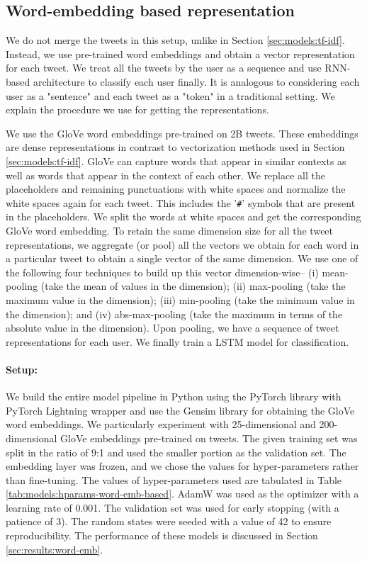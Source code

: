 \subsection{Word-embedding based representation}
\label{sec:models:word-emb-based}

We do not merge the tweets in this setup, unlike in Section \ref{sec:models:tf-idf}. Instead, we use pre-trained word embeddings and obtain a vector representation for each tweet. We treat all the tweets by the user as a sequence and use \ac{RNN}-based architecture to classify each user finally. It is analogous to considering each user as a "sentence" and each tweet as a "token" in a traditional setting. We explain the procedure we use for getting the representations.

We use the \ac{GloVe} \cite{glove} word embeddings pre-trained on 2B tweets. These embeddings are dense representations in contrast to vectorization methods used in Section \ref{sec:models:tf-idf}. \ac{GloVe} can capture words that appear in similar contexts as well as words that appear in the context of each other. We replace all the \maskEmoji placeholders and remaining punctuations with white spaces and normalize the white spaces again for each tweet. This includes the '\texttt{\#}' symbols that are present in the placeholders. We split the words at white spaces and get the corresponding \ac{GloVe} word embedding. To retain the same dimension size for all the tweet representations, we aggregate (or pool) all the vectors we obtain for each word in a particular tweet to obtain a single vector of the same dimension. We use one of the following four techniques to build up this vector dimension-wise-- (i) mean-pooling (take the mean of values in the dimension); (ii) max-pooling (take the maximum value in the dimension); (iii) min-pooling (take the minimum value in the dimension); and (iv) abs-max-pooling (take the maximum in terms of the absolute value in the dimension). Upon pooling, we have a sequence of tweet representations for each user. We finally train a \ac{LSTM} model \cite{lstm} for classification.


\paragraph{Setup:} We build the entire model pipeline in Python using the PyTorch \cite{pytorch} library with PyTorch Lightning \cite{pytorch_lightning} wrapper and use the Gensim \cite{gensim} library for obtaining the \ac{GloVe} word embeddings. We particularly experiment with 25-dimensional and 200-dimensional \ac{GloVe} embeddings pre-trained on tweets. The given training set was split in the ratio of 9:1 and used the smaller portion as the validation set. The embedding layer was frozen, and we chose the values for hyper-parameters rather than fine-tuning. The values of hyper-parameters used are tabulated in Table \ref{tab:models:hparams-word-emb-based}. AdamW \cite{adamw} was used as the optimizer with a learning rate of 0.001. The validation set was used for early stopping (with a patience of 3). The random states were seeded with a value of 42 to ensure reproducibility. The performance of these models is discussed in Section \ref{sec:results:word-emb}.

